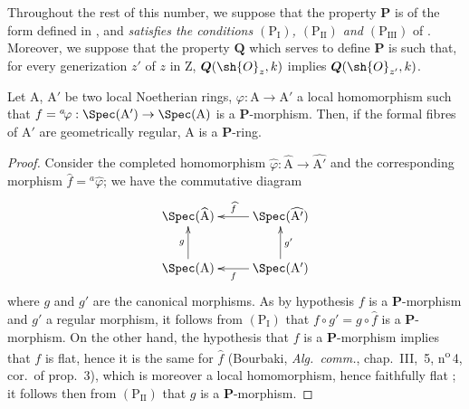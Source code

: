 \begin{env}[7.4.1]
\label{IV.7.4.1}
Throughout the rest of this number, we suppose that the property $\boldsymbol{P}$ is of the form defined in , and \emph{satisfies the conditions $(\mathrm{P_I})$, $(\mathrm{P_{II}})$ and $(\mathrm{P_{III}})$} of .
Moreover, we suppose that the property $\boldsymbol{Q}$ which serves to define $\boldsymbol{P}$ is such that, for every generization $z'$ of $z$ in $\mathrm{Z}$, $\boldsymbol{Q}(\sh{O}_z,k)$ implies $\boldsymbol{Q}(\sh{O}_{z'},k)$.
\end{env}

\begin{lemma}[7.4.2]
\label{IV.7.4.2}
Let $\mathrm{A}$, $\mathrm{A}'$ be two local Noetherian rings, $\varphi:\mathrm{A}\to\mathrm{A}'$ a local homomorphism such that $f={}^a\!\varphi:\Spec(\mathrm{A}')\to\Spec(\mathrm{A})$ is a $\boldsymbol{P}$-morphism.
Then, if the formal fibres of $\mathrm{A}'$ are geometrically regular, $\mathrm{A}$ is a $\boldsymbol{P}$-ring.
\end{lemma}


\begin{proof}
Consider the completed homomorphism $\widehat{\varphi}:\widehat{\mathrm{A}}\to\widehat{\mathrm{A}'}$ and the corresponding morphism $\widehat{f}={}^a\!\widehat{\varphi}$; we have the commutative diagram
\[
\xymatrix{
  \Spec(\widehat{\mathrm{A}}) & \Spec(\widehat{\mathrm{A}'}) \ar[l]_-{\widehat{f}} \\
  \Spec(\mathrm{A}) \ar[u]^{g} & \Spec(\mathrm{A}') \ar[l]^-{f} \ar[u]_{g'}
}
\]
where $g$ and $g'$ are the canonical morphisms.
As by hypothesis $f$ is a $\boldsymbol{P}$-morphism and $g'$ a regular morphism, it follows from $(\mathrm{P_I})$ that $f\circ g'=g\circ\widehat{f}$ is a $\boldsymbol{P}$-morphism.
On the other hand, the hypothesis that $f$ is a $\boldsymbol{P}$-morphism implies that $f$ is flat, hence it is the same for $\widehat{f}$ (Bourbaki, \emph{Alg.\ comm.}, chap.~III, \textsection\,5, n\textsuperscript{o}\,4, cor.~of prop.~3), which is moreover a local homomorphism, hence faithfully flat ; it follows then from $(\mathrm{P_{II}})$ that $g$ is a $\boldsymbol{P}$-morphism.
\end{proof}

